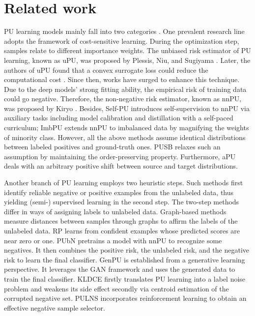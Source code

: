 \documentclass[final]{cvpr}
\newcommand{\yunrui}[1]{#1}
\begin{document}
\section{Related work}
PU learning models mainly fall into two categories \cite{DBLP:journals/ml/BekkerD20}. One prevalent research line adopts the framework of cost-sensitive learning. During the optimization step, samples relate to different importance weights. The unbiased risk estimator of PU learning, known as uPU, was proposed by Plessis, Niu, and Sugiyama \cite{DBLP:conf/nips/PlessisNS14}. Later, the authors of uPU found that a convex surrogate loss could reduce the computational cost \cite{DBLP:conf/icml/PlessisNS15}. Since then, works have surged to enhance this technique. Due to the deep models’ strong fitting ability, the empirical risk of training data could go negative. Therefore, the non-negative risk estimator, known as nnPU, was proposed by Kiryo \cite{DBLP:conf/nips/KiryoNPS17}. Besides, Self-PU \cite{DBLP:conf/icml/ChenCCYG0W20} introduces self-supervision to nnPU via auxiliary tasks \yunrui{including} model calibration and distillation \yunrui{with a self-paced curriculum}; ImbPU \cite{DBLP:conf/ijcai/SuCX21} extends nnPU to imbalanced data \yunrui{by magnifying the weights of minority class.} However, all the above methods assume identical distributions between labeled positives and ground-truth ones. PUSB \cite{DBLP:conf/iclr/KatoTH19} relaxes such an assumption by maintaining the order-preserving property. Furthermore, aPU \cite{DBLP:conf/nips/HammoudehL20} deals with an arbitrary positive shift between source and target distributions.

Another branch of PU learning employs two heuristic steps. Such methods \cite{DBLP:conf/icml/LiuLYL02,DBLP:journals/tkde/YuHC04} 
first identify reliable negative or positive examples from the unlabeled data, thus yielding (semi-) supervised learning in the second step. The two-step methods differ in ways of \yunrui{assigning labels to unlabeled data}. 
Graph-based methods \cite{DBLP:conf/nips/ZhouBLWS03,DBLP:conf/iconip/ChaudhariS12,DBLP:journals/jcp/ZhangZ09} measure distances between samples through graphs to affirm the labels of the unlabeled data. RP \cite{northcutt2017rankpruning} learns from confident examples whose predicted scores are near zero or one. PUbN \cite{DBLP:conf/icml/HsiehNS19} pretrains a model with nnPU to recognize some negatives. It then combines the positive risk, the unlabeled risk, and the negative risk to learn the final classifier. GenPU \cite{hou2018generative} is established from a generative learning perspective. It leverages the GAN framework and uses the generated data to train the final classifier. KLDCE\cite{gong2019loss} firstly translates PU learning into a label noise problem and weakens its side effect secondly via centroid estimation of the corrupted negative set. PULNS \cite{DBLP:conf/aaai/LuoZCQDZWCHRL21} incorporates reinforcement learning to obtain an effective negative sample selector.
\end{document}
